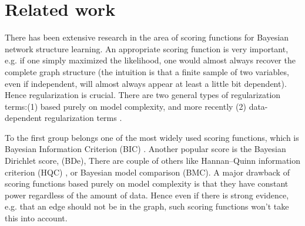 \documentclass{article} %
\begin{document}
\section{Related work}
There has been extensive research in the area of scoring functions for
Bayesian network structure learning. An appropriate scoring function is very important, e.g. if one simply maximized the likelihood, one would almost always recover the complete graph structure (the intuition is that a finite sample of two variables, even if independent, will almost always appear at least a little bit dependent).  Hence regularization is crucial.  There are two general types of regularization terms:(1) based purely on model complexity, and more recently (2) data-dependent regularization terms \cite{brenner2013sparsityboost}.

To the first group belongs one of the most widely used scoring functions, which is Bayesian Information Criterion (BIC) \cite{schwarz1978estimating}.  Another popular score is the Bayesian Dirichlet score, (BDe), There are couple of others like Hannan–Quinn information criterion (HQC) \cite{hannan1979determination},
or Bayesian model comparison (BMC). A major drawback of scoring functions based purely on model complexity is that they have constant power regardless of the amount of data.  Hence even if there is strong evidence, e.g. that an edge should not be in the graph, such scoring functions won't take this into account.
\end{document}
